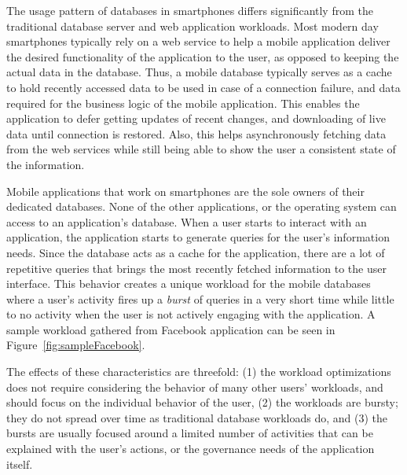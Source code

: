 
The usage pattern of databases in smartphones differs significantly from the traditional database server and web application workloads.
Most modern day smartphones typically rely on a web service to help a mobile application deliver the desired functionality of the application to the user, as opposed to keeping the actual data in the database.
Thus, a mobile database typically serves as a cache to hold recently accessed data to be used in case of a connection failure, and data required for the business logic of the mobile application.
This enables the application to defer getting updates of recent changes, and downloading of live data until connection is restored.
Also, this helps asynchronously fetching data from the web services while still being able to show the user a consistent state of the information.

Mobile applications that work on smartphones are the sole owners of their dedicated databases.
None of the other applications, or the operating system can access to an application's database.
When a user starts to interact with an application, the application starts to generate queries for the user's information needs.
Since the database acts as a cache for the application, there are a lot of repetitive queries that brings the most recently fetched information to the user interface.
This behavior creates a unique workload for the mobile databases where a user's activity fires up a \emph{burst} of queries in a very short time while little to no activity when the user is not actively engaging with the application. A sample workload gathered from Facebook application can be seen in Figure~\ref{fig:sampleFacebook}.

The effects of these characteristics are threefold:
(1) the workload optimizations does not require considering the behavior of many other users' workloads, and should focus on the individual behavior of the user,
(2) the workloads are bursty; they do not spread over time as traditional database workloads do, and
(3) the bursts are usually focused around a limited number of activities that can be explained with the user's actions, or the governance needs of the application itself.

